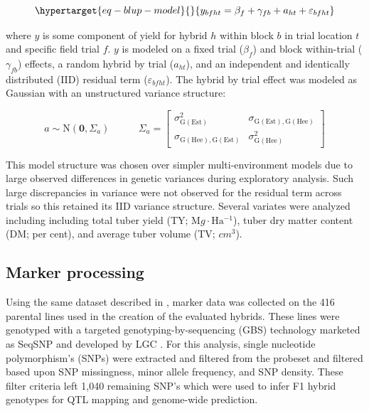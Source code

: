 \begin{equation}\protect\hypertarget{eq-blup-model}{}{ y_{bfht} = \beta_f +\gamma_{fb} + a_{ht} + \varepsilon_{bfht} }\label{eq-blup-model}\end{equation}

where \(y\) is some component of yield for hybrid \(h\) within block
\(b\) in trial location \(t\) and specific field trial \(f\). \(y\) is
modeled on a fixed trial (\(\beta_f\)) and block within-trial
(\(\gamma_{fb}\)) effects, a random hybrid by trial (\(a_{ht}\)), and an
independent and identically distributed (IID) residual term
(\(\varepsilon_{bfht}\)). The hybrid by trial effect was modeled as
Gaussian with an unstructured variance structure:

\[a \sim \mathrm{N} \left (\mathbf{0},  \Sigma_a \right )  ~~~~~~~~~~~~~  \Sigma_a =\begin{bmatrix} \sigma^2_{\mathrm{G(Est)}} &  \sigma_{\mathrm{G(Est),G(Hee)}}\\ \sigma_{\mathrm{G(Hee),G(Est)}} & \sigma^2_{\mathrm{G(Hee)}}\end{bmatrix}\]

This model structure was chosen over simpler multi-environment models
due to large observed differences in genetic variances during
exploratory analysis. Such large discrepancies in variance were not
observed for the residual term across trials so this retained its IID
variance structure. Several variates were analyzed including including
total tuber yield (TY; \(\mathrm Mg \cdot \mathrm{Ha^{-1}}\)), tuber dry
matter content (DM; per cent), and average tuber volume (TV; \(cm^3\)).

\hypertarget{marker-processing}{%
\subsection{Marker processing}\label{marker-processing}}

Using the same dataset described in \autocite{Adams2023}, marker data
was collected on the 416 parental lines used in the creation of the
evaluated hybrids. These lines were genotyped with a targeted
genotyping-by-sequencing (GBS) technology marketed as SeqSNP and
developed by LGC \autocite{LGC2019}. For this analysis, single
nucleotide polymorphism's (SNPs) were extracted and filtered from the
probeset and filtered based upon SNP missingness, minor allele
frequency, and SNP density. These filter criteria left 1,040 remaining
SNP's which were used to infer F1 hybrid genotypes for QTL mapping and
genome-wide prediction.

